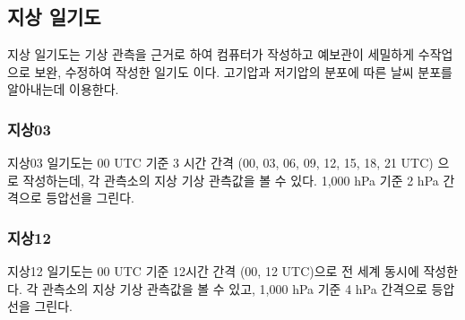 \subsection{지상 일기도}
 지상 일기도는 기상 관측을 근거로 하여 컴퓨터가 작성하고 예보관이 세밀하게 수작업으로 보완, 수정하여 작성한 일기도 이다. 고기압과 저기압의 분포에 따른 날씨 분포를 알아내는데 이용한다.

\subsubsection{지상03}
지상03 일기도는 00 UTC 기준 3 시간 간격 (00, 03, 06, 09, 12, 15, 18, 21 UTC) 으로 작성하는데, 각 관측소의 지상 기상 관측값을 볼 수 있다. 1,000 hPa 기준 2 hPa 간격으로 등압선을 그린다. 


\subsubsection{지상12}
지상12 일기도는 00 UTC 기준 12시간 간격 (00, 12 UTC)으로 전 세계 동시에 작성한다. 각 관측소의 지상 기상 관측값을 볼 수 있고, 1,000 hPa 기준 4 hPa 간격으로 등압선을 그린다. 

